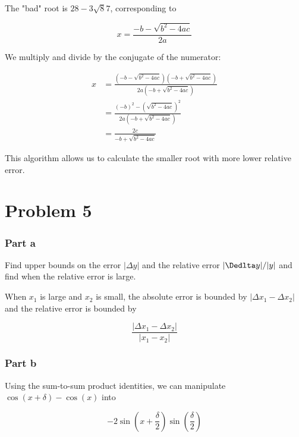 \documentclass[12pt]{article}
\begin{document}
The "bad" root is $28 - 3\sqrt87$, corresponding to 

$$ x = \frac{-b - \sqrt{b^2 - 4ac}}{2a} $$

We multiply and divide by the conjugate of the numerator:

\begin{align*}
	x &= \frac{(-b - \sqrt{b^2 - 4ac})(-b + \sqrt{b^2 - 4ac})}{2a(-b + \sqrt{b^2 - 4ac})} \\
	&= \frac{(-b)^2 - (\sqrt{b^2 - 4ac})^2}{2a(-b + \sqrt{b^2 - 4ac})} \\
	&= \frac{2c}{-b + \sqrt{b^2 - 4ac}}
\end{align*}

This algorithm allows us to calculate the smaller root with more lower relative error.


\section*{Problem 5}
\subsubsection*{Part a}

Find upper bounds on the error $|\Delta y|$ and the relative error  $|\Dedlta y|/|y|$ and find when the relative error is large.

When $x_1$ is large and $x_2$ is small, the absolute error is bounded by $|\Delta x_1 - \Delta x_2|$ and the relative error is bounded by 

$$ \frac{|\Delta x_1 - \Delta x_2|}{|x_1-x_2|}$$

\subsubsection*{Part b}

Using the sum-to-sum product identities, we can manipulate $\cos(x + \delta) - \cos(x) $ into

$$-2 \sin\left(x + \frac{\delta}{2}\right) \sin\left(\frac{\delta}{2}\right) $$
\end{document}
